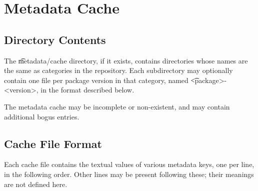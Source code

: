\chapter{Metadata Cache}
\label{ch:metadata-cache}

\section{Directory Contents}

The \t{metadata/cache} directory, if it exists, contains directories whose names are the same as
categories in the repository. Each subdirectory may optionally contain one file per package version
in that category, named \t{<package>-<version>}, in the format described below.

The metadata cache may be incomplete or non-existent, and may contain additional bogus entries.

\section{Cache File Format}

Each cache file contains the textual values of various metadata keys, one per line, in the following
order. Other lines may be present following these; their meanings are not defined here.

